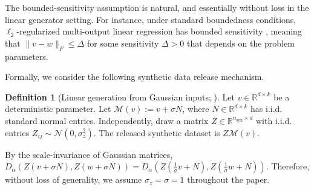 \documentclass{article}
\theoremstyle{plain}
\theoremstyle{definition}
\newtheorem{definition}[theorem]{Definition}
\theoremstyle{remark}
\DeclareMathOperator*{\argmin}{arg\,min}
\begin{document}


The bounded-sensitivity assumption is natural, and essentially without loss in the linear generator setting. For instance, under standard boundedness conditions, $\ell_2$-regularized multi-output linear regression has bounded sensitivity \citep{chaudhuri2011differentiallyprivateempiricalrisk,pierquin2025}, meaning that $\|v-w\|_F \leq \Delta$ for some sensitivity $\Delta > 0$ that depends on the problem parameters.



Formally, we consider the following synthetic data release mechanism.
\begin{definition}[Linear generation from Gaussian inputs; \citealt{pierquin2025}]
    Let $v \in \mathbb{R}^{d \times k}$ be a deterministic parameter. Let $\mathcal{M}(v) := v + \sigma N$, where $N\in\mathbb{R}^{d\times k}$ has i.i.d. standard normal entries. Independently, draw a matrix $Z\in\mathbb{R}^{n_{\mathrm{syn}}\times d}$ with i.i.d. entries $Z_{ij}\sim\mathcal{N}(0,\sigma_z^2)$. The released synthetic dataset is $Z\mathcal{M}(v)$.
\end{definition}
By the scale-invariance of Gaussian matrices, $D_\alpha(Z(v+\sigma N),Z(w + \sigma N)) = D_\alpha(Z(\frac{1}{\sigma} v + N), Z(\frac{1}{\sigma}w + N))$. Therefore, without loss of generality, we assume $\sigma_z = \sigma = 1$ throughout the paper.
\end{document}
